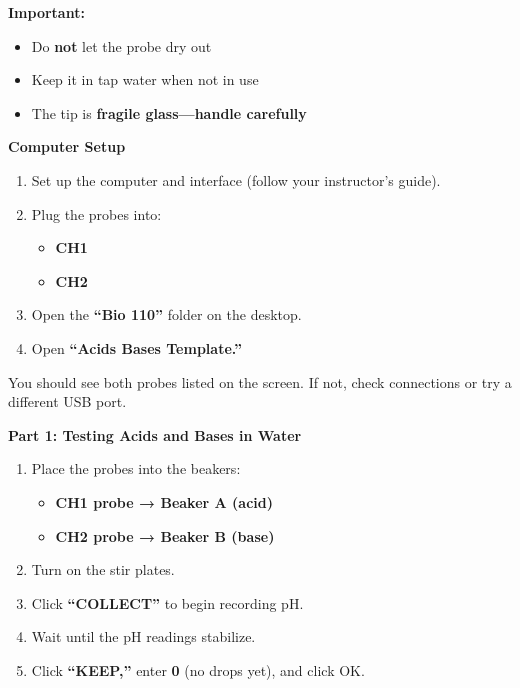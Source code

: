 \documentclass[
  letterpaper,
  DIV=11,
  numbers=noendperiod]{scrreprt}
\begin{document}
\textbf{Important:}

\begin{itemize}
\item
  Do \textbf{not} let the probe dry out
\item
  Keep it in tap water when not in use
\item
  The tip is \textbf{fragile glass---handle carefully}
\end{itemize}

\textbf{Computer Setup}

\begin{enumerate}
\def\labelenumi{\arabic{enumi}.}
\setcounter{enumi}{6}
\item
  Set up the computer and interface (follow your instructor's guide).
\item
  Plug the probes into:

  \begin{itemize}
  \item
    \textbf{CH1}
  \item
    \textbf{CH2}
  \end{itemize}
\item
  Open the \textbf{``Bio 110''} folder on the desktop.
\item
  Open \textbf{``Acids Bases Template.''}
\end{enumerate}

You should see both probes listed on the screen. If not, check
connections or try a different USB port.

\textbf{Part 1: Testing Acids and Bases in Water}

\begin{enumerate}
\def\labelenumi{\arabic{enumi}.}
\item
  Place the probes into the beakers:

  \begin{itemize}
  \item
    \textbf{CH1 probe → Beaker A (acid)}
  \item
    \textbf{CH2 probe → Beaker B (base)}
  \end{itemize}
\item
  Turn on the stir plates.
\item
  Click \textbf{``COLLECT''} to begin recording pH.
\item
  Wait until the pH readings stabilize.
\item
  Click \textbf{``KEEP,''} enter \textbf{0} (no drops yet), and click
  OK.
\end{enumerate}
\end{document}
